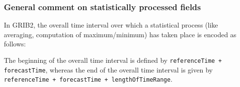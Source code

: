 \subsubsection{General comment on statistically processed fields}

In GRIB2, the overall time interval over which a statistical process (like averaging, computation of maximum/minimum) has taken place is 
encoded as follows:

The beginning of the overall time interval is defined by \texttt{referenceTime + forecastTime}, whereas the end of the 
overall time interval is given by \texttt{referenceTime + forecastTime + lengthOfTimeRange}.




